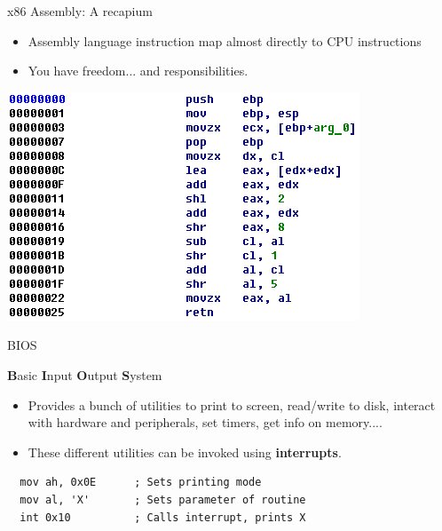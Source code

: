 \documentclass{beamer}
\begin{document}
 \begin{frame}{x86 Assembly: A recapium}
  \begin{itemize}
   \item Assembly language instruction map almost directly to CPU instructions
   \item You have freedom... and responsibilities.
  \end{itemize}
 \begin{center}
  \includegraphics[scale = .6]{asm}
 \end{center}
 \end{frame}


 \begin{frame}[fragile]{BIOS}
 \begin{framed}
  \begin{center}\huge
   \textbf{B}asic \textbf{I}nput \textbf{O}utput \textbf{S}ystem
  \end{center}
 \end{framed}

  \begin{itemize}
   \item Provides a bunch of utilities to print to screen, read/write to disk, interact with hardware and peripherals, set timers, get info on memory....
   \item These different utilities can be invoked using \textbf{interrupts}.
  \end{itemize}
\begin{framed}
   \begin{verbatim}
  mov ah, 0x0E      ; Sets printing mode
  mov al, 'X'       ; Sets parameter of routine
  int 0x10          ; Calls interrupt, prints X
   \end{verbatim}
\end{framed}


 \end{frame}
\end{document}
